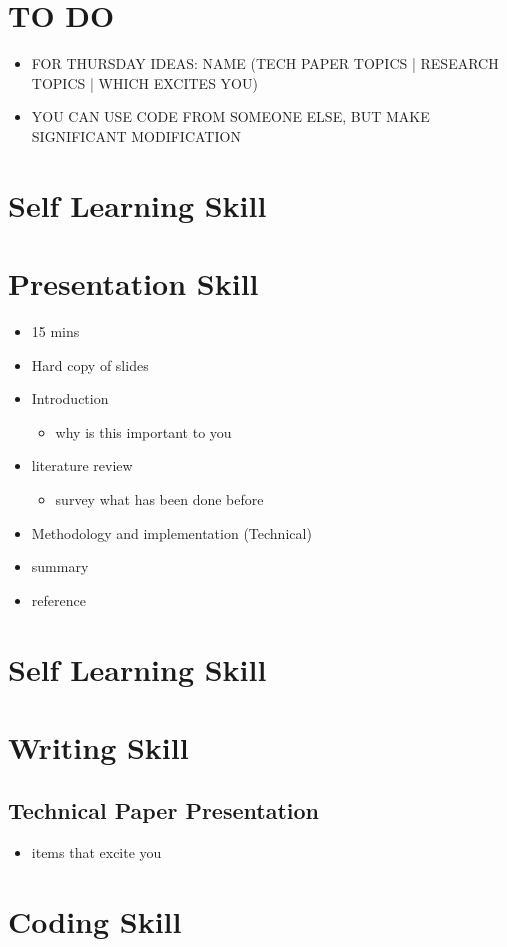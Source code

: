 \documentclass[]{article}
\title{}
\author{Russ Seaman}
\begin{document}
\maketitle
\tableofcontents

\begin{abstract}

\end{abstract}

\section{TO DO}
\begin{itemize}
	\item FOR THURSDAY IDEAS: NAME (TECH PAPER TOPICS | RESEARCH TOPICS | WHICH EXCITES YOU)
	\item YOU CAN USE CODE FROM SOMEONE ELSE, BUT MAKE SIGNIFICANT MODIFICATION

\end{itemize}
\section{Self Learning Skill}

\section{Presentation Skill}
\begin{itemize}
	\item 15 mins
	\item Hard copy of slides 
	\item Introduction
	\begin{itemize}
		\item why is this important to you
	\end{itemize}
	\item literature review
	\begin{itemize}
		\item survey what has been done before
	\end{itemize}
	\item Methodology and implementation (Technical)
	\item summary
	\item reference
\end{itemize}
\section{Self Learning Skill}
\section{Writing Skill}
\subsection{Technical Paper Presentation}
\begin{itemize}
	\item items that excite you
\end{itemize}
\section{Coding Skill}
\end{document}

